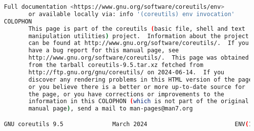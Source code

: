 {{\begin{lstlisting}[language=bash]
       Full documentation <https://www.gnu.org/software/coreutils/env>
       or available locally via: info '(coreutils) env invocation'
COLOPHON
       This page is part of the coreutils (basic file, shell and text
       manipulation utilities) project.  Information about the project
       can be found at http://www.gnu.org/software/coreutils/.  If you
       have a bug report for this manual page, see
       http://www.gnu.org/software/coreutils/.  This page was obtained
       from the tarball coreutils-9.5.tar.xz fetched from
       http://ftp.gnu.org/gnu/coreutils/ on 2024-06-14.  If you
       discover any rendering problems in this HTML version of the page,
       or you believe there is a better or more up-to-date source for
       the page, or you have corrections or improvements to the
       information in this COLOPHON (which is not part of the original
       manual page), send a mail to man-pages@man7.org

GNU coreutils 9.5              March 2024                         ENV(1)
\end{lstlisting}
}}
\endinput  %
